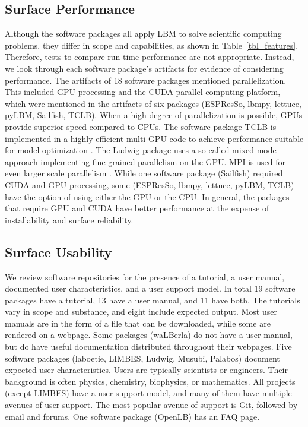 \documentclass[final, 3p, times, authoryear]{elsarticle}
\begin{document}
\subsection{Surface Performance}

Although the software packages all apply LBM to solve scientific computing
problems, they differ in scope and capabilities, as shown in
Table~\ref{tbl_features}. Therefore, tests to compare run-time performance are
not appropriate. Instead, we look through each software package's artifacts
for evidence of considering performance. The artifacts of 18 software packages
mentioned parallelization. This included GPU processing and the CUDA parallel
computing platform, which were mentioned in the artifacts of six packages
(ESPResSo, lbmpy, lettuce, pyLBM, Sailfish, TCLB). When a high degree of
parallelization is possible, GPUs provide superior speed compared to CPUs. The
software package TCLB is implemented in a highly efficient multi-GPU code to
achieve performance suitable for model optimization \citep{rutkowski2020open}.
The Ludwig package uses a so-called mixed mode approach implementing
fine-grained parallelism on the GPU.  MPI is used for even larger scale
parallelism \citep{gray2013ludwig}. While one software package (Sailfish)
required CUDA and GPU processing, some (ESPResSo, lbmpy, lettuce, pyLBM, TCLB)
have the option of using either the GPU or the CPU. In general, the packages
that require GPU and CUDA have better performance at the expense of
installability and surface reliability.

\subsection{Surface Usability}

We review software repositories for the presence of a tutorial, a user manual,
documented user characteristics, and a user support model. In total 19 software
packages have a tutorial, 13 have a user manual, and 11 have both. The tutorials
vary in scope and substance, and eight include expected output. Most user
manuals are in the form of a file that can be downloaded, while some are
rendered on a webpage. Some packages (waLBerla) do not have a user manual, but
do have useful documentation distributed throughout their webpages. Five
software packages (laboetie, LIMBES, Ludwig, Musubi, Palabos) document expected
user characteristics. Users are typically scientists or engineers. Their
background is often physics, chemistry, biophysics, or mathematics. All projects
(except LIMBES) have a user support model, and many of them have multiple
avenues of user support. The most popular avenue of support is Git, followed by
email and forums. One software package (OpenLB) has an FAQ page.    
\end{document}
